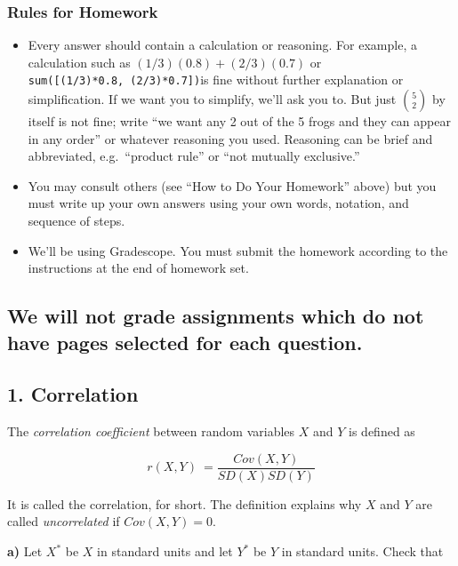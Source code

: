 \documentclass[11pt]{article}
\providecommand{\tightlist}{%
      \setlength{\itemsep}{0pt}\setlength{\parskip}{0pt}}
\begin{document}
    \subsubsection{Rules for Homework}\label{rules-for-homework}

\begin{itemize}
\tightlist
\item
  Every answer should contain a calculation or reasoning. For example, a
  calculation such as \((1/3)(0.8) + (2/3)(0.7)\) or
  \texttt{sum({[}(1/3)*0.8,\ (2/3)*0.7{]})}is fine without further
  explanation or simplification. If we want you to simplify, we'll ask
  you to. But just \({5 \choose 2}\) by itself is not fine; write ``we
  want any 2 out of the 5 frogs and they can appear in any order'' or
  whatever reasoning you used. Reasoning can be brief and abbreviated,
  e.g.~``product rule'' or ``not mutually exclusive.''
\item
  You may consult others (see ``How to Do Your Homework'' above) but you
  must write up your own answers using your own words, notation, and
  sequence of steps.
\item
  We'll be using Gradescope. You must submit the homework according to
  the instructions at the end of homework set.
\end{itemize}

    \subsection{\texorpdfstring{\textbf{We will not grade assignments which
do not have pages selected for each
question.}}{We will not grade assignments which do not have pages selected for each question.}}\label{we-will-not-grade-assignments-which-do-not-have-pages-selected-for-each-question.}

    \newpage

    \subsection{1. Correlation}\label{correlation}

The \emph{correlation coefficient} between random variables \(X\) and
\(Y\) is defined as

\[
r(X, Y) ~ = \frac{Cov(X, Y)}{SD(X)SD(Y)}
\]

It is called the correlation, for short. The definition explains why
\(X\) and \(Y\) are called \emph{uncorrelated} if \(Cov(X, Y) = 0\).

\textbf{a)} Let \(X^*\) be \(X\) in standard units and let \(Y^*\) be
\(Y\) in standard units. Check that
\end{document}
